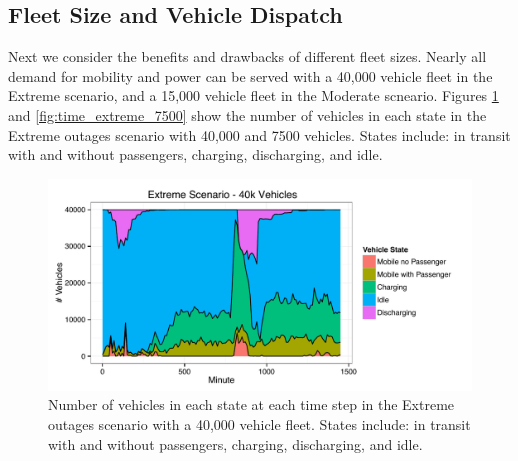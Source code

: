 \documentclass[journal]{IEEEtran}
\begin{document}

\subsection{Fleet Size and Vehicle Dispatch}
Next we consider the benefits and drawbacks of different fleet sizes. Nearly all demand for mobility and power can be served with a 40,000 vehicle fleet in the Extreme scenario, and a 15,000 vehicle fleet in the Moderate scneario. Figures \ref{fig:time_extreme_40k} and \ref{fig:time_extreme_7500} show the number of vehicles in each state in the Extreme outages scenario with 40,000 and 7500 vehicles. States include: in transit with and without passengers, charging, discharging, and idle. 



\begin{figure}[!htbp]
  \includegraphics[width=\linewidth]{plots/states-area-40k.pdf}
  \caption{Number of vehicles in each state at each time step in the Extreme outages scenario with a 40,000 vehicle fleet. States include: in transit with and without passengers, charging, discharging, and idle.}
  \label{fig:time_extreme_40k}
\end{figure}
\end{document}
